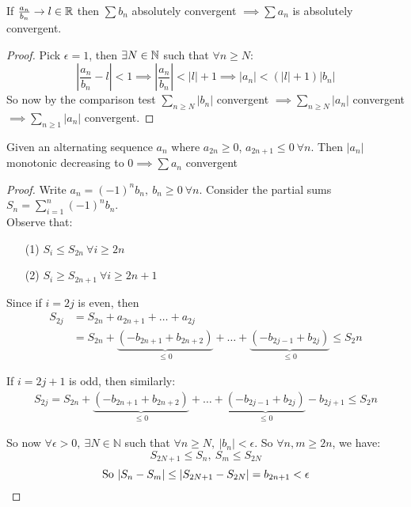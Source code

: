 \begin{theorem}
If $\frac{a_n}{b_n}\to l \in \mathbb{R}$ then $\sum b_n$ absolutely convergent $\implies \sum a_n$ is absolutely convergent.
\end{theorem}
\begin{proof}
Pick $\epsilon = 1$, then $\exists N \in \mathbb{N}$ such that $\forall n \geq N$:
\[\left|\frac{a_n}{b_n} - l \right| < 1 \implies \left|\frac{a_n}{b_n}\right| < |l| + 1 \implies |a_n| < (|l| + 1)|b_n|\]
So now by the comparison test $\sum_{n \geq N} |b_n|$ convergent $\implies \sum_{n \geq N} |a_n|$ convergent $\implies \sum_{n\geq 1} |a_n|$ convergent. 	
\end{proof}\vspace*{10pt}
\pagebreak

\begin{theorem}
Given an alternating sequence $a_n$ where $a_{2n} \geq 0$, $a_{2n+1} \leq 0~ \forall n$. Then $|a_n|$ monotonic decreasing to $0 \implies \sum a_n$ convergent
\end{theorem}

\begin{proof}
Write $a_n = (-1)^nb_n,~b_n\geq 0 ~\forall n	$. Consider the partial sums $S_n = \sum_{i=1}^{n} (-1)^nb_n$.\\

\noindent  Observe that: \begin{enumerate}
 \item[(1)]$S_i \leq S_{2n}~\forall i \geq 2n$
 \item[(2)]$S_i \geq S_{2n+1}~\forall i\geq 2n+1$
 \end{enumerate}
 Since if $i=2j$ is even, then
  \[\begin{aligned}
	S_{2j} &= S_{2n} + a_{2n+1} + \dots + a_{2j}\\ 
	&= S_{2n} + \underbrace{(-b_{2n+1} + b_{2n+2})}_{\leq 0} + \dots + \underbrace{(-b_{2j-1} + b_{2j})}_{\leq 0} \leq S_2n
\end{aligned}
\]
 
  If $i= 2j+1$ is odd, then similarly:
   \[\begin{aligned}
	S_{2j} = S_{2n} + \underbrace{(-b_{2n+1} + b_{2n+2})}_{\leq 0} + \dots + \underbrace{(-b_{2j-1} + b_{2j})}_{\leq 0} - b_{2j+1} \leq S_2n
\end{aligned}
\]
  
\noindent So now $\forall \epsilon >0,~ \exists N \in \mathbb{N}$ such that $\forall n \geq N,~|b_n| < \epsilon$. So $\forall n,m\geq 2n$, we have: \[S_{2N+1} \leq S_n,~S_m \leq S_{2N}\] 
 \[\text{So } |S_n - S_m| \leq |S_{2N+1} - S_{2N}| = b_{2n+1} < \epsilon \qedhere\]
\end{proof}~


